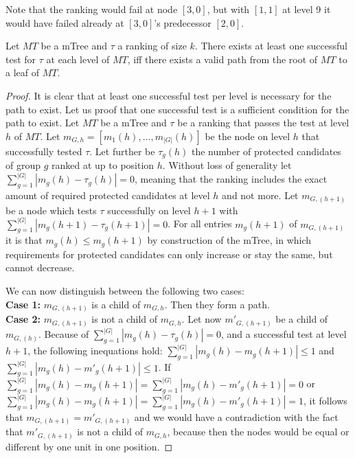 %
Note that the ranking would fail at node $[3,0]$, but with $[1,1]$ at level 9 it would have failed already at $[3,0]$'s predecessor $[2,0]$.
%
\begin{theorem}
\label{theorem:lazy-mTree-test}
Let $MT$ be a mTree and $\tau$ a ranking of size $k$.
%
There exists at least one successful test for $\tau$ at each level of $MT$,
iff there exists a valid path from the root of $MT$ to a leaf of $MT$.
\end{theorem}
%
\begin{proof}
	\label{proof:lazy-mTree-test}
	It is clear that at least one successful test per level is necessary for the path to exist.
	Let us proof that one successful test is a sufficient condition for the path to exist.
	Let $MT$ be a mTree and $\tau$ be a ranking that passes the test at level $h$ of $MT$.
	Let $m_{G,h}=[m_{1}(h), \ldots, m_{|G|}(h)]$ be the node on level $h$ that successfully tested $\tau$.
	Let further be $\tau_g(h)$ the number of protected candidates of group $g$ ranked at up to position $h$.
	Without loss of generality let $\sum_{g=1}^{|G|} |m_{g}(h) - \tau_{g}(h)| = 0$, meaning that the ranking includes the exact amount of required protected candidates at level $h$ and not more.
	Let $m_{G,(h+1)}$ be a node which tests $\tau$ successfully on level $h+1$ with $\sum_{g=1}^{|G|} |m_{g}(h+1) - \tau_{g}(h+1)| = 0$.
	For all entries $m_{g}(h+1)$ of $m_{G,(h+1)}$ it is that $m_{g}(h) \leq m_{g}(h+1)$ by construction of the mTree, in which requirements for protected candidates can only increase or stay the same, but cannot decrease.

	\noindent We can now distinguish between the following two cases:
	\\
	\textbf{Case 1:} $m_{G,(h+1)}$ is a child of $m_{G,h}$.
	Then they form a path. %
	\\
	\textbf{Case 2:} $m_{G,(h+1)}$ is not a child of $m_{G,h}$.
	Let now ${m'}_{G,(h+1)}$ be a child of $m_{G,(h)}$.
	Because of $\sum_{g=1}^{|G|} |m_{g}(h) - \tau_{g}(h)| = 0$, and a successful test at level $h+1$, the following inequations hold: $\sum_{g=1}^{|G|} |m_{g}(h) - m_g(h+1)| \leq 1$ and $\sum_{g=1}^{|G|} |m_{g}(h) - m'_g(h+1)| \leq 1$.
	If $\sum_{g=1}^{|G|} |m_{g}(h) - m_g(h+1)| = \sum_{g=1}^{|G|} |m_{g}(h) - m'_g(h+1)| = 0$ or $\sum_{g=1}^{|G|} |m_{g}(h) - m_g(h+1)| = \sum_{g=1}^{|G|} |m_{g}(h) - m'_g(h+1)| = 1$, it follows that $m_{G,(h+1)} = {m'}_{G,(h+1)}$ and we would have a contradiction with the fact that ${m'}_{G,(h+1)}$ is not a child of $m_{G,h}$, because then the nodes would be equal or different by one unit in one position.


\end{proof}
